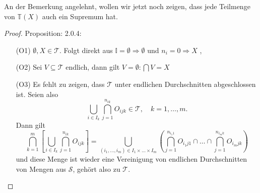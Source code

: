 
An der Bemerkung angelehnt, wollen wir jetzt noch zeigen, dass jede Teilmenge von $\mathbb{T}(X)$ auch ein Supremum hat.


\begin{proof}{Proposition: 2.0.4:}\\

  \begin{itemize}
    \item[(O1)] $\emptyset, X \in \mathcal{T}$.
    Folgt direkt aus $\mathbb{I} = \emptyset \Rightarrow \emptyset$ 
    und $n_i = 0 \Rightarrow X$ ,
    \item[(O2)] Sei $V \subseteq \mathcal{T}$ endlich, dann gilt $V = \emptyset: \bigcap V = X$
    \item[(O3)] Es fehlt zu zeigen, dass $\mathcal{T}$ 
    unter endlichen Durchschnitten abgeschlossen ist. Seien also
    \begin{equation*}
      \bigcup_{i \in I_k} \bigcap_{j = 1}^{n_{ik}} O_{ijk} \in \mathcal{T}, 
      \quad k = 1, \dots, m.
    \end{equation*}
    Dann gilt
    \begin{equation*}
      \bigcap_{k = 1}^{m} 
      \left[
        \bigcup_{i \in I_k} \bigcap_{j = 1}^{n_{ik}} O_{ijk}
      \right]
      =
      \bigcup_{(i_1, \dots, i_m) \in I_1 \times \dots \times I_m}
      \left(
        \bigcap_{j = 1}^{n_{i_1 1}} O_{i_1 j 1}
        \cap \dots \cap
        \bigcap_{j = 1}^{n_{i_m k}} O_{i_m j k}
      \right)
    \end{equation*}
    und diese Menge ist wieder eine Vereinigung von endlichen Durchschnitten von Mengen aus 
    $\mathcal{S}$,  
    gehört also zu $\mathcal{T}$.
  \end{itemize}
\end{proof}


